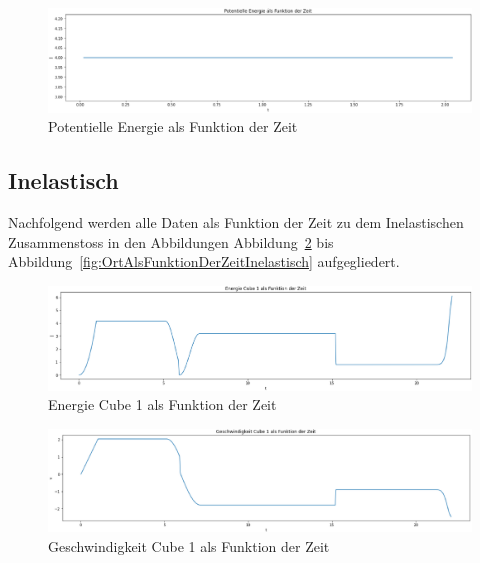 \documentclass[../main.tex]{subfiles}
\begin{document}
    \begin{figure}[H]
        \begin{center}
            \centerline{\includegraphics[width=155mm]{./images/Elastisch/PotentielleEnergieAlsFunktionDerZeit}}
            \caption{Potentielle Energie als Funktion der Zeit}
            \label{fig:PotentielleEnergieAlsFunktionDerZeit}
        \end{center}
    \end{figure}

    \subsection{Inelastisch}
    Nachfolgend werden alle Daten als Funktion der Zeit zu dem Inelastischen Zusammenstoss in den Abbildungen
    Abbildung~\ref{fig:EnergieCube1AlsFunktionDerZeit} bis Abbildung~\ref{fig:OrtAlsFunktionDerZeitInelastisch}
    aufgegliedert.

    \begin{figure}[H]
        \begin{center}
            \centerline{\includegraphics[width=155mm]{./images/Inelastisch/EnergieCube1AlsFunktionDerZeit}}
            \caption{Energie Cube 1 als Funktion der Zeit}
            \label{fig:EnergieCube1AlsFunktionDerZeit}
        \end{center}
    \end{figure}

    \begin{figure}[H]
        \begin{center}
            \centerline{\includegraphics[width=155mm]{./images/Inelastisch/GeschwindigkeitCube1AlFunktionDerZeit}}
            \caption{Geschwindigkeit Cube 1 als Funktion der Zeit}
            \label{fig:GeschwindigkeitCube1AlFunktionDerZeit}
        \end{center}
    \end{figure}
\end{document}
